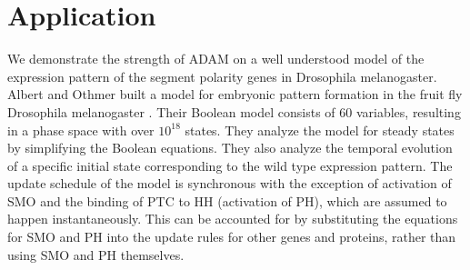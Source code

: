 \documentclass[11pt]{amsart}
\begin{document}
\section{Application} \label{benchmarks}
We demonstrate the strength of ADAM on a well understood model of the expression
pattern of the segment polarity genes in Drosophila melanogaster. Albert and Othmer built a model for embryonic pattern formation in the fruit fly Drosophila melanogaster \cite{AO}. Their Boolean
model consists of 60 variables, resulting in a phase
space with over $10^{18}$ states. They analyze the model for steady states by simplifying the Boolean equations. They also analyze the temporal evolution of a specific initial state corresponding to the wild type expression pattern. The update schedule of the model is synchronous  with the exception of activation of SMO and the binding of PTC to HH (activation of PH), which are assumed to happen instantaneously. This can be accounted for by substituting the equations for SMO and PH into the update rules for other genes and proteins, rather than using SMO and PH themselves.
 
\end{document}
